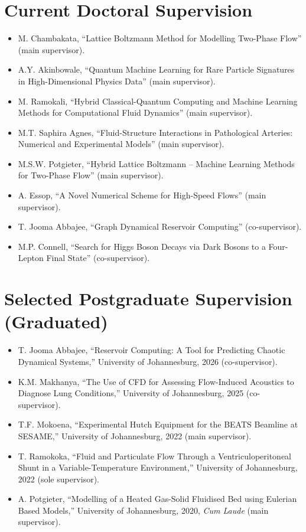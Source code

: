 \documentclass[11pt, a4paper]{article}
\begin{document}
\section{Current Doctoral Supervision}
\begin{itemize}
  \item M. Chambakata, ``Lattice Boltzmann Method for Modelling Two-Phase Flow'' (main supervisor).
  \item A.Y. Akinbowale, ``Quantum Machine Learning for Rare Particle Signatures in High-Dimensional Physics Data'' (main supervisor).
  \item M. Ramokali, ``Hybrid Classical-Quantum Computing and Machine Learning Methods for Computational Fluid Dynamics'' (main supervisor).
  \item M.T. Saphira Agnes, ``Fluid-Structure Interactions in Pathological Arteries: Numerical and Experimental Models'' (main supervisor).
  \item M.S.W. Potgieter, ``Hybrid Lattice Boltzmann -- Machine Learning Methods for Two-Phase Flow'' (main supervisor).
  \item A. Essop, ``A Novel Numerical Scheme for High-Speed Flows'' (main supervisor).
  \item T. Jooma Abbajee, ``Graph Dynamical Reservoir Computing'' (co-supervisor).
  \item M.P. Connell, ``Search for Higgs Boson Decays via Dark Bosons to a Four-Lepton Final State'' (co-supervisor).
\end{itemize}

\section{Selected Postgraduate Supervision (Graduated)}
\begin{itemize}
  \item T. Jooma Abbajee, ``Reservoir Computing: A Tool for Predicting Chaotic Dynamical Systems,'' University of Johannesburg, 2026 (co-supervisor).
  \item K.M. Makhanya, ``The Use of CFD for Assessing Flow-Induced Acoustics to Diagnose Lung Conditions,'' University of Johannesburg, 2025 (co-supervisor).
  \item T.F. Mokoena, ``Experimental Hutch Equipment for the BEATS Beamline at SESAME,'' University of Johannesburg, 2022 (main supervisor).
  \item T. Ramokoka, ``Fluid and Particulate Flow Through a Ventriculoperitoneal Shunt in a Variable-Temperature Environment,'' University of Johannesburg, 2022 (sole supervisor).
  \item A. Potgieter, ``Modelling of a Heated Gas-Solid Fluidised Bed using Eulerian Based Models,'' University of Johannesburg, 2020, \textit{Cum Laude} (main supervisor).
\end{itemize}
\end{document}

